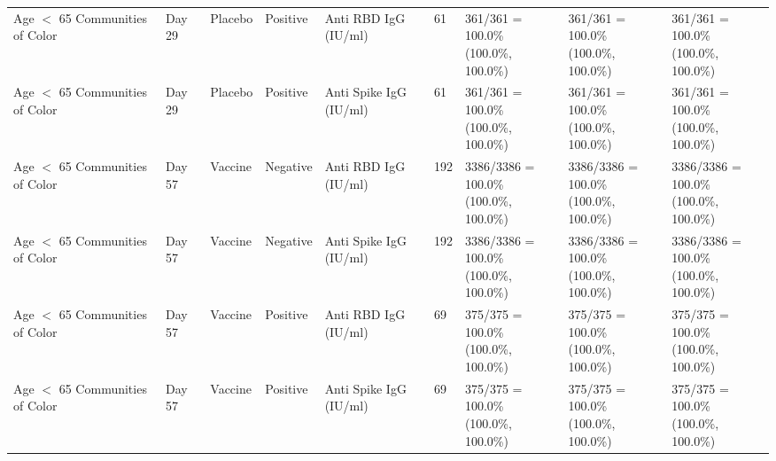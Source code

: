 \documentclass[]{book}
\theoremstyle{definition}
\theoremstyle{definition}
\theoremstyle{definition}
\newcommand{\1}{\mathbbm{1}}
\begin{document}
\begin{landscape}
\begin{ThreePartTable}
\begin{longtable}[t]{>{\raggedright\arraybackslash}p{2.7cm}llllllll}
\hspace{1em}Age $<$ 65 Communities of Color & Day 29 & Placebo & Positive & Anti RBD IgG (IU/ml) & 61 & \makecell[l]{361/361 = 100.0\%\\(100.0\%, 100.0\%)} & \makecell[l]{361/361 = 100.0\%\\(100.0\%, 100.0\%)} & \makecell[l]{361/361 = 100.0\%\\(100.0\%, 100.0\%)}\\
\hspace{1em}Age $<$ 65 Communities of Color & Day 29 & Placebo & Positive & Anti Spike IgG (IU/ml) & 61 & \makecell[l]{361/361 = 100.0\%\\(100.0\%, 100.0\%)} & \makecell[l]{361/361 = 100.0\%\\(100.0\%, 100.0\%)} & \makecell[l]{361/361 = 100.0\%\\(100.0\%, 100.0\%)}\\
\hspace{1em}Age $<$ 65 Communities of Color & Day 57 & Vaccine & Negative & Anti RBD IgG (IU/ml) & 192 & \makecell[l]{3386/3386 = 100.0\%\\(100.0\%, 100.0\%)} & \makecell[l]{3386/3386 = 100.0\%\\(100.0\%, 100.0\%)} & \makecell[l]{3386/3386 = 100.0\%\\(100.0\%, 100.0\%)}\\
\hspace{1em}Age $<$ 65 Communities of Color & Day 57 & Vaccine & Negative & Anti Spike IgG (IU/ml) & 192 & \makecell[l]{3386/3386 = 100.0\%\\(100.0\%, 100.0\%)} & \makecell[l]{3386/3386 = 100.0\%\\(100.0\%, 100.0\%)} & \makecell[l]{3386/3386 = 100.0\%\\(100.0\%, 100.0\%)}\\
\hspace{1em}Age $<$ 65 Communities of Color & Day 57 & Vaccine & Positive & Anti RBD IgG (IU/ml) & 69 & \makecell[l]{375/375 = 100.0\%\\(100.0\%, 100.0\%)} & \makecell[l]{375/375 = 100.0\%\\(100.0\%, 100.0\%)} & \makecell[l]{375/375 = 100.0\%\\(100.0\%, 100.0\%)}\\
\hspace{1em}Age $<$ 65 Communities of Color & Day 57 & Vaccine & Positive & Anti Spike IgG (IU/ml) & 69 & \makecell[l]{375/375 = 100.0\%\\(100.0\%, 100.0\%)} & \makecell[l]{375/375 = 100.0\%\\(100.0\%, 100.0\%)} & \makecell[l]{375/375 = 100.0\%\\(100.0\%, 100.0\%)}\\

\end{longtable}
\end{ThreePartTable}
\end{landscape}
\end{document}
